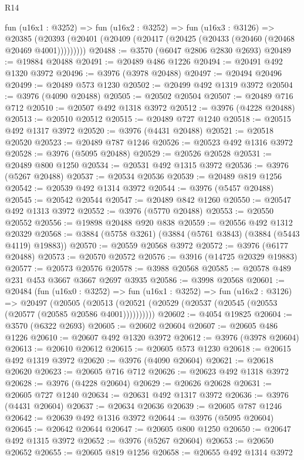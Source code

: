 \begin{lexlean}{R14}
\begin{coremodule}
    fun (u16x1 : @3252) =>
    fun (u16x2 : @3252) =>
    fun (u16x3 : @3126) =>
    @20385 (@20393 (@20401 (@20409 (@20417 (@20425 (@20433 (@20460 (@20468 @20469 @4001)))))))))
@20488 := @3570 (@6047 @2806 @2830 @2693)
@20489 := @19884 @20488
@20491 := @20489 @486 @1226
@20494 := @20491 @492 @1320 @3972
@20496 := @3976 (@3978 @20488)
@20497 := @20494 @20496
@20499 := @20489 @573 @1230
@20502 := @20499 @492 @1319 @3972
@20504 := @3976 (@4090 @20488)
@20505 := @20502 @20504
@20507 := @20489 @716 @712
@20510 := @20507 @492 @1318 @3972
@20512 := @3976 (@4228 @20488)
@20513 := @20510 @20512
@20515 := @20489 @727 @1240
@20518 := @20515 @492 @1317 @3972
@20520 := @3976 (@4431 @20488)
@20521 := @20518 @20520
@20523 := @20489 @787 @1246
@20526 := @20523 @492 @1316 @3972
@20528 := @3976 (@5095 @20488)
@20529 := @20526 @20528
@20531 := @20489 @800 @1250
@20534 := @20531 @492 @1315 @3972
@20536 := @3976 (@5267 @20488)
@20537 := @20534 @20536
@20539 := @20489 @819 @1256
@20542 := @20539 @492 @1314 @3972
@20544 := @3976 (@5457 @20488)
@20545 := @20542 @20544
@20547 := @20489 @842 @1260
@20550 := @20547 @492 @1313 @3972
@20552 := @3976 (@5770 @20488)
@20553 := @20550 @20552
@20556 := @19898 @20488 @920 @838
@20559 := @20556 @492 @1312 @20329
@20568 := @3884 (@5758 @3261) (@3884 (@5761 @3843) (@3884 (@5443 @4119) @19883))
@20570 := @20559 @20568 @3972
@20572 := @3976 (@6177 @20488)
@20573 := @20570 @20572
@20576 := @3916 (@14725 @20329 @19883)
@20577 := @20573 @20576
@20578 := @3988 @20568
@20585 := @20578 @489 @231 @453 @3667 @3667 @2697 @3935
@20586 := @3998 @20568
@20601 := @20484
    (fun (u16x0 : @3252) =>
    fun (u16x1 : @3252) =>
    fun (u16x2 : @3126) =>
    @20497
      (@20505 (@20513 (@20521 (@20529 (@20537 (@20545 (@20553 (@20577 (@20585 @20586 @4001))))))))))
@20602 := @4054 @19825
@20604 := @3570 (@6322 @2693)
@20605 := @20602 @20604
@20607 := @20605 @486 @1226
@20610 := @20607 @492 @1320 @3972
@20612 := @3976 (@3978 @20604)
@20613 := @20610 @20612
@20615 := @20605 @573 @1230
@20618 := @20615 @492 @1319 @3972
@20620 := @3976 (@4090 @20604)
@20621 := @20618 @20620
@20623 := @20605 @716 @712
@20626 := @20623 @492 @1318 @3972
@20628 := @3976 (@4228 @20604)
@20629 := @20626 @20628
@20631 := @20605 @727 @1240
@20634 := @20631 @492 @1317 @3972
@20636 := @3976 (@4431 @20604)
@20637 := @20634 @20636
@20639 := @20605 @787 @1246
@20642 := @20639 @492 @1316 @3972
@20644 := @3976 (@5095 @20604)
@20645 := @20642 @20644
@20647 := @20605 @800 @1250
@20650 := @20647 @492 @1315 @3972
@20652 := @3976 (@5267 @20604)
@20653 := @20650 @20652
@20655 := @20605 @819 @1256
@20658 := @20655 @492 @1314 @3972

\end{coremodule}
\end{lexlean}
